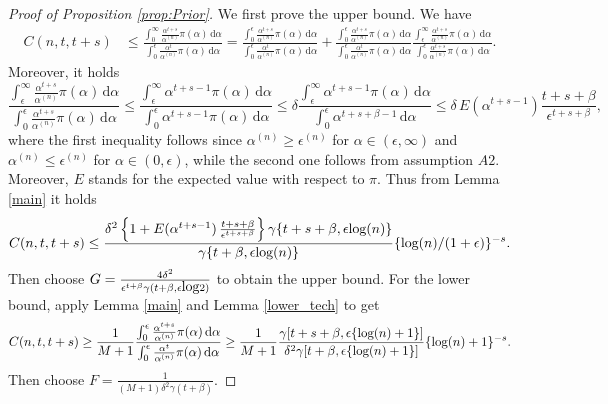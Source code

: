 \documentclass[12pt]{article}
\def\log{\hbox{log}}
\begin{document}
\begin{proof}[Proof of Proposition \ref{prop:Prior}]
We first prove the upper bound. We have%
\begin{align*}
C(n,t,t+s) &\leq \frac{\int_0^\infty \frac{\alpha^{t+s}}{\alpha^{(n)}}\pi(\alpha)\, \mathrm{d}\alpha}{\int_0^\epsilon \frac{\alpha^t}{\alpha^{(n)}}\pi(\alpha) \, \mathrm{d}\alpha}
= \frac{\int_0^\epsilon \frac{\alpha^{t+s}}{\alpha^{(n)}}\pi(\alpha)\, \mathrm{d}\alpha}{\int_0^\epsilon \frac{\alpha^t}{\alpha^{(n)}}\pi(\alpha) \, \mathrm{d}\alpha}+ \frac{\int_0^\epsilon \frac{\alpha^{t+s}}{\alpha^{(n)}}\pi(\alpha)\, \mathrm{d}\alpha}{\int_0^\epsilon \frac{\alpha^t}{\alpha^{(n)}}\pi(\alpha) \, \mathrm{d}\alpha} \frac{\int_\epsilon^\infty \frac{\alpha^{t+s}}{\alpha^{(n)}}\pi(\alpha)\, \mathrm{d}\alpha}{\int_0^\epsilon \frac{\alpha^{t+s}}{\alpha^{(n)}}\pi(\alpha) \, \mathrm{d}\alpha}.
\end{align*}
Moreover, %
it holds 
\[
\frac{\int_\epsilon^\infty \frac{\alpha^{t+s}}{\alpha^{(n)}}\pi(\alpha)\, \mathrm{d}\alpha}{\int_0^\epsilon \frac{\alpha^{t+s}}{\alpha^{(n)}}\pi(\alpha) \, \mathrm{d}\alpha} \leq \frac{\int_\epsilon^\infty \alpha^{t+s-1}\pi(\alpha)\, \mathrm{d}\alpha}{\int_0^\epsilon \alpha^{t+s-1}\pi(\alpha) \, \mathrm{d}\alpha} \leq \delta\frac{\int_\epsilon^\infty \alpha^{t+s-1}\pi(\alpha)\, \mathrm{d}\alpha}{\int_0^\epsilon \alpha^{t+s+\beta-1}\, \mathrm{d}\alpha} \leq \delta \, E(\alpha^{t+s-1}) \frac{t+s+\beta}{\epsilon^{t+s+\beta}},
\]
where the first inequality follows since $\alpha^{(n)} \geq \epsilon^{(n)}$ for $\alpha \in (\epsilon, \infty)$ and $\alpha^{(n)} \leq \epsilon^{(n)}$ for $\alpha \in (0,\epsilon)$, while the second one follows from assumption $A2$. 
Moreover, $E$ stands for the expected value with respect to $\pi$.
Thus from Lemma \ref{main} it holds 
\[
C(n,t,t+s) \leq \frac{\delta^2 \left\{1+E(\alpha^{t+s-1})\, \frac{t+s+\beta}{\epsilon^{t+s+\beta}}  \right\}\gamma\{t+s+\beta,\epsilon\log(n)\}}{\gamma\{t+\beta,\epsilon\log(n)\}}\{\log(n)/(1+\epsilon)\}^{-s}.
\]
Then choose $G = \frac{4\delta^2}{\epsilon^{t+\beta}\gamma(t+\beta, \epsilon \log 2)}$ to obtain the upper bound. 
For the lower bound, apply Lemma \ref{main} and Lemma \ref{lower_tech} to get
\[
C(n,t,t+s) \geq \frac{1}{M+1}\frac{\int_0^\epsilon \frac{\alpha^{t+s}}{\alpha^{(n)}}\pi(\alpha)\, \mathrm{d}\alpha}{\int_0^\epsilon \frac{\alpha^t}{\alpha^{(n)}}\pi(\alpha) \, \mathrm{d}\alpha}  \geq \frac{1}{M+1}\frac{\gamma[t+s+\beta,\epsilon\{\log(n)+1\}]}{\delta^2\gamma[t+\beta,\epsilon\{\log(n)+1\}]}\{\log(n)+1\}^{-s}.
\]
Then choose $F = \frac{1}{(M+1)\delta^2 \gamma(t+\beta)}$.
\end{proof}
\end{document}
